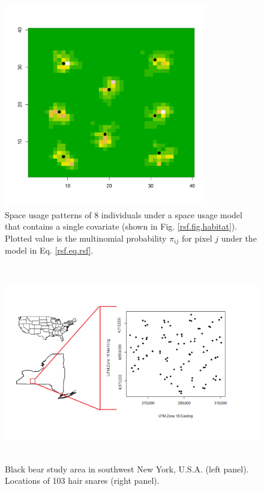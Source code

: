 \documentclass[12pt]{article}
\begin{document}
\begin{figure}
\centering
\includegraphics[width=3.5in,height=3.5in]{figs/homeranges8}
\caption{Space usage patterns of 8 individuals under a space usage
  model that contains a single covariate (shown in
  Fig. \ref{rsf.fig.habitat}). Plotted value is the multinomial
  probability $\pi_{ij}$ for pixel $j$ under the model in Eq. \ref{rsf.eq.rsf}.
}
\label{rsf.fig.homeranges}
\end{figure}

\begin{figure}
\centering
\includegraphics[width=5.6in,height=3.4in]{figs/US_NYS_studyArea.png}
\caption{Black bear study area in southwest New York, U.S.A. (left
  panel).
Locations of 103 hair snares (right panel).}
\label{rsf.fig.studyarea}
\end{figure}
\end{document}
